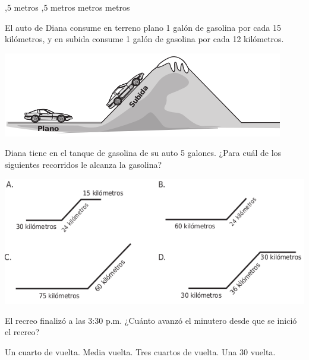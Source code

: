 \documentclass[10pt,letterpaper,addpoints]{exam}
\begin{document}
\begin{multicols}{2}
\begin{questions}
\begin{multicols}{2}
\begin{choices}
,5 metros
,5 metros
 metros
 metros
\end{choices}
\end{multicols}
\question El auto de Diana consume en terreno plano 1 galón de gasolina por cada 15 kilómetros, y en subida consume 1 galón de gasolina por cada 12 kilómetros.
\begin{center}
\includegraphics[scale=.5]{Images/carro_diana.png} 
\end{center}
Diana tiene en el tanque de gasolina de su auto 5 galones. ¿Para cuál de los siguientes recorridos le alcanza la gasolina?
\begin{center}
\includegraphics[scale=.4]{Images/recorridos_diana.png} 
\end{center}
\question El recreo finalizó a las 3:30 p.m. ¿Cuánto avanzó el minutero desde que se inició el recreo?
\begin{choices}
\choice Un cuarto de vuelta.
\CorrectChoice Media vuelta.
\choice Tres cuartos de vuelta.
\choice Una 30 vuelta.
\end{choices}
\end{questions}
\end{multicols}
\end{document}
